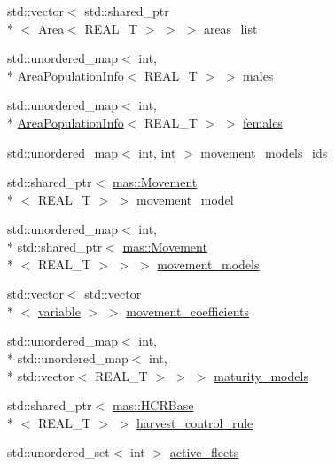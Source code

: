 \begin{DoxyCompactItemize}
\item 
std\-::vector$<$ std\-::shared\-\_\-ptr\\*
$<$ \hyperlink{structmas_1_1_area}{Area}$<$ R\-E\-A\-L\-\_\-\-T $>$ $>$ $>$ \hyperlink{classmas_1_1_population_a3633009c9043c6531989337ab8749ab3}{areas\-\_\-list}
\item 
std\-::unordered\-\_\-map$<$ int, \\*
\hyperlink{structmas_1_1_area_population_info}{Area\-Population\-Info}$<$ R\-E\-A\-L\-\_\-\-T $>$ $>$ \hyperlink{classmas_1_1_population_a224336670db7b89a7d9490fddbbf88f1}{males}
\item 
std\-::unordered\-\_\-map$<$ int, \\*
\hyperlink{structmas_1_1_area_population_info}{Area\-Population\-Info}$<$ R\-E\-A\-L\-\_\-\-T $>$ $>$ \hyperlink{classmas_1_1_population_adeeb5c8b2056ea2bc21d7d57ec700ae5}{females}
\item 
std\-::unordered\-\_\-map$<$ int, int $>$ \hyperlink{classmas_1_1_population_ab98ba8e32dbc1650b3452adaa6bd09e1}{movement\-\_\-models\-\_\-ids}
\item 
std\-::shared\-\_\-ptr$<$ \hyperlink{structmas_1_1_movement}{mas\-::\-Movement}\\*
$<$ R\-E\-A\-L\-\_\-\-T $>$ $>$ \hyperlink{classmas_1_1_population_a8452be41c1534e55f5c8169655f8f6c3}{movement\-\_\-model}
\item 
std\-::unordered\-\_\-map$<$ int, \\*
std\-::shared\-\_\-ptr$<$ \hyperlink{structmas_1_1_movement}{mas\-::\-Movement}\\*
$<$ R\-E\-A\-L\-\_\-\-T $>$ $>$ $>$ \hyperlink{classmas_1_1_population_ae53093b412fcb3c074a90fccdfc747fe}{movement\-\_\-models}
\item 
std\-::vector$<$ std\-::vector\\*
$<$ \hyperlink{classmas_1_1_population_a55b9219455246e0cab7f84ae49f0271f}{variable} $>$ $>$ \hyperlink{classmas_1_1_population_a99d5b7c5e089b8313abaffe5491848bc}{movement\-\_\-coefficients}
\item 
std\-::unordered\-\_\-map$<$ int, \\*
std\-::unordered\-\_\-map$<$ int, \\*
std\-::vector$<$ R\-E\-A\-L\-\_\-\-T $>$ $>$ $>$ \hyperlink{classmas_1_1_population_a4953be176d66e895dafa26d3754339a7}{maturity\-\_\-models}
\item 
std\-::shared\-\_\-ptr$<$ \hyperlink{structmas_1_1_h_c_r_base}{mas\-::\-H\-C\-R\-Base}\\*
$<$ R\-E\-A\-L\-\_\-\-T $>$ $>$ \hyperlink{classmas_1_1_population_a161064be0d713a6a0481f297f84f5729}{harvest\-\_\-control\-\_\-rule}
\item 
std\-::unordered\-\_\-set$<$ int $>$ \hyperlink{classmas_1_1_population_a4d87c6a8ce6a0ad5b65f5209a103094c}{active\-\_\-fleets}
\end{DoxyCompactItemize}


